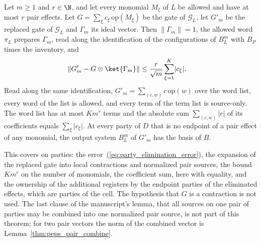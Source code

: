 \begin{theorem}
    \label{thm:party_pair_effect_elimination}
    \leanok
    Let $m\ge1$ and $r\in\N$, and let every monomial $M_\xi$ of $L$ be allowed and have
    at most $r$ pair effects. Let $G=\sum_\xi c_\xi\,\mathrm{op}(M_\xi)$ be the gate
    of $\mathcal G_L$, let $G'_m$
    be the replaced gate of $\mathcal G_L$ and $\Gamma_m$ its ideal vector. Then
    $\lVert\Gamma_m\rVert=1$, the allowed word $\pi_L$ prepares $\Gamma_m$, read
    along the identification of the configurations of $B^m_L$ with $B_P$ times the
    inventory, and
    \begin{align}
        \lVert G'_m-G\otimes\ket{\Gamma_m}\rVert
         & \le\frac{r}{\sqrt m}\sum_{\xi=1}^K\lvert c_\xi\rvert.
        \label{eq:party_elimination_error}
    \end{align}
    Read along the same identification, $G'_m=\sum_{(c,w)}c\,\mathrm{op}(w)$ over
    the word list, every word of the list is allowed, and every term of the term
    list is source-only. The word list has at most $Km^r$ terms and the absolute sum
    $\sum_{(c,w)}\lvert c\rvert$ of its coefficients equals
    $\sum_\xi\lvert c_\xi\rvert$. At every party of $D$ that is no endpoint of a
    pair effect of any monomial, the output system $B^m_L$ of $G'_m$ has the basis of
    $B$.
\end{theorem}

This covers \cite[Lemma~5.1]{OpenAI2026PolynomialPEPS} on parties: the
error~(\ref{eq:party_elimination_error}), the expansion of the replaced gate into
local contractions and normalized pair sources, the bound $Km^r$ on the number of
monomials, the coefficient sum, here with equality, and the ownership of the
additional registers by the endpoint parties of the eliminated effects, which are
parties of the cell. The hypothesis that $G$ is a contraction is not used. The last
clause of the manuscript's lemma, that all sources on one pair of parties may be
combined into one normalized pair source, is not part of this theorem; for two pair
vectors the norm of the combined vector is Lemma~\ref{thm:peps_pair_combine}.

